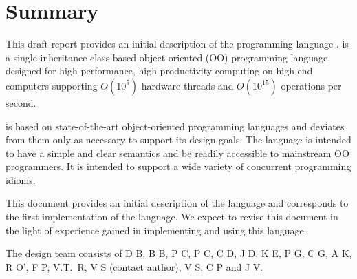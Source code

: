 
\thispagestyle{empty}




\chapter*{Summary}
This draft report provides an initial description of the programming
language \Xten. \Xten{} is a single-inheritance class-based object-oriented
(OO) programming language designed for high-performance, high-productivity
computing on high-end computers supporting $O(10^5)$ hardware threads
and $O(10^{15})$ operations per second. 

{}\Xten{} is based on state-of-the-art object-oriented programming
languages and deviates from them only as necessary to support its
design goals. The language is intended to have a simple and clear
semantics and be readily accessible to mainstream OO programmers. It
is intended to support a wide variety of concurrent programming
idioms.

This document provides an initial description of the language and
corresponds to the first implementation of the language.  We expect to
revise this document in the light of experience gained in implementing
and using this language.

The \Xten{} design team consists of 
D B, 
B B, 
P C, 
P C, 
C D, 
J D, 
K E,
P G, 
C G, 
A K, 
R O', 
F P, 
V.T.~R, 
V S (contact author), 
V S,
C P
and 
J V.

